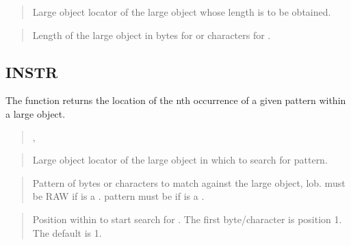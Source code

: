 \documentclass[letterpaper,10pt,english,openany,oneside]{sphinxmanual}
\begin{document}

\begin{quote}

Large object locator of the large object whose length is to be obtained.
\end{quote}

\begin{quote}

Length of the large object in bytes for  or characters for .
\end{quote}

\newpage


\subsection{INSTR}
\label{\detokenize{instr:instr}}\label{\detokenize{instr::doc}}
The  function returns the location of the nth occurrence of a given
pattern within a large object.
\begin{quote}

,

\end{quote}


\begin{quote}

Large object locator of the large object in which to search for pattern.
\end{quote}

\begin{quote}

Pattern of bytes or characters to match against the large object, lob.
 must be RAW if  is a . pattern must be 
if  is a .
\end{quote}

\begin{quote}

Position within  to start search for . The first
byte/character is position 1. The default is 1.
\end{quote}
\end{document}

